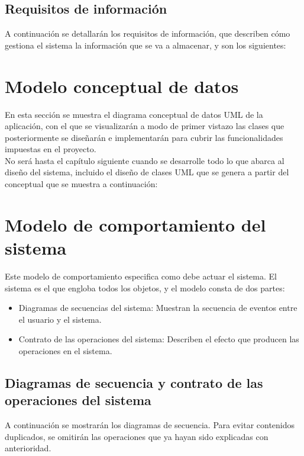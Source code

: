 \subsection{Requisitos de información}

A continuación se detallarán los requisitos de información, que describen cómo gestiona el sistema la información que se va a almacenar, y son los siguientes:

\section{Modelo conceptual de datos}

En esta sección se muestra el diagrama conceptual de datos UML de la aplicación, con el que se visualizarán a modo de primer vistazo las clases que posteriormente se diseñarán e implementarán para cubrir las funcionalidades impuestas en el proyecto.\\

No será hasta el capítulo siguiente cuando se desarrolle todo lo que abarca al diseño del sistema, incluido el diseño de clases UML que se genera a partir del conceptual que se muestra a continuación:

\section{Modelo de comportamiento del sistema}

Este modelo de comportamiento especifica como debe actuar el sistema. El sistema es el que engloba todos los objetos, y el modelo consta de dos partes:

\begin{itemize}
\item Diagramas de secuencias del sistema: Muestran la secuencia de eventos entre el usuario y el sistema.
\item Contrato de las operaciones del sistema: Describen el efecto que producen las operaciones en el sistema.
\end{itemize}

\subsection{Diagramas de secuencia y contrato de las operaciones del sistema}

A continuación se mostrarán los diagramas de secuencia. Para evitar contenidos duplicados, se omitirán las operaciones que ya hayan sido explicadas con anterioridad.














